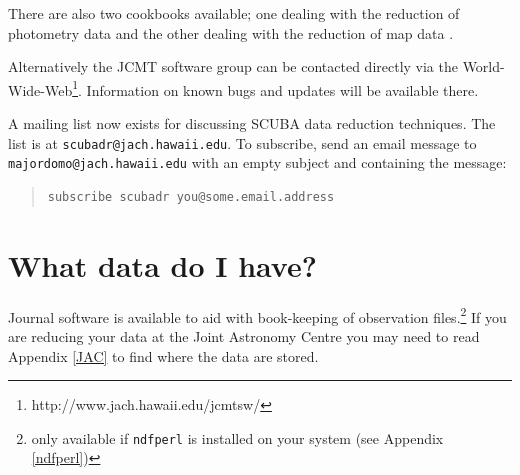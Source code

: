 \documentclass[twoside,11pt]{article}
\newenvironment{myquote}{\begin{quote}\begin{small}}{\end{small}\end{quote}}
\newcommand{\htmladdnormallinkfoot}[2]{#1\footnote{#2}}
\newcommand{\htmladdnormallink}[2]{#1}
\newcommand{\xlabel}[1]{}
\renewcommand{\_}{\texttt{\symbol{95}}}
\begin{document}
There are also two cookbooks available; one dealing with the reduction of
photometry data \cite{S97} and the other dealing with the reduction of
map data \cite{SANDELL97}.

Alternatively the JCMT software group can be contacted directly via the
\htmladdnormallinkfoot{World-Wide-Web}{http://www.jach.hawaii.edu/jcmt\_sw/}.
Information on known bugs and updates will be available there.

A mailing list now exists for discussing SCUBA data reduction techniques.  The
list is at
\htmladdnormallink{\texttt{scubadr@jach.hawaii.edu}}{mailto:scubadr@jach.hawaii.edu}. To
subscribe, send an email message to
\htmladdnormallink{\texttt{majordomo@jach.hawaii.edu}}{mailto:majordomo@jach.hawaii.edu}
with an empty subject and containing the message:
\begin{myquote}
\begin{verbatim}
subscribe scubadr you@some.email.address
\end{verbatim}
\end{myquote}


\section{\xlabel{journal}What data do I have?\label{journal}}

Journal software is available to aid with book-keeping of observation
files.\footnote{only available if {\tt ndfperl} is installed on your system
(see Appendix \ref{ndfperl})}  If you are reducing your data at the Joint
Astronomy Centre you may need to read Appendix \ref{JAC} to find where the
data are stored.
\end{document}
